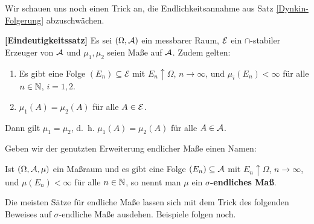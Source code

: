 Wir schauen uns noch einen Trick an, die Endlichkeitsannahme aus Satz \ref{Dynkin-Folgerung} abzuschw\"achen.
\begin{satz}\label{folg} \textbf{[Eindeutigkeitssatz]}
	Es sei $(\Omega, \mathcal{A})$ ein messbarer Raum, $\mathcal{E}$ ein $\cap$-stabiler Erzeuger von $\mathcal{A}$ und $\mu_1,\mu_2$ seien Maße auf $\mathcal{A}$. Zudem gelten:
	\begin{enumerate}[label=(\roman*)]		
		\item Es gibt eine Folge $(E_n) \subseteq \mathcal E$ mit $E_n \uparrow \Omega$, $n \to \infty$, und $\mu_i(E_n) < \infty$ für alle $n \in \mathbb{N}$, $i = 1,2$.		
		\item $\mu_1(A) = \mu_2(A)$ für alle $A \in \mathcal{E}$.
	\end{enumerate}
	Dann gilt $\mu_1 = \mu_2$, \mbox{d. h.} $\mu_1(A) = \mu_2(A)$ für alle $A \in \mathcal{A}$.
\end{satz}
Geben wir der genutzten Erweiterung endlicher Ma\ss e einen Namen: 
\begin{deff} 
	Ist $(\Omega, \mathcal{A}, \mu)$ ein Maßraum und es gibt eine Folge $(E_n) \subseteq \mathcal{A}$ mit $E_n \uparrow \Omega$, $n \to \infty$, und $\mu(E_n) < \infty$ f\"ur alle $n \in \mathbb{N}$, so nennt man $\mu$ ein \textbf{$\sigma$-endliches Maß}.
\end{deff}
Die meisten S\"atze f\"ur endliche Ma\ss e lassen sich mit dem Trick des folgenden Beweises auf $\sigma$-endliche Ma\ss e ausdehen. Beispiele folgen noch.

